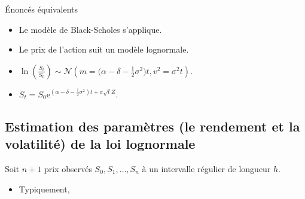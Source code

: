 \documentclass[10pt, french]{article}
\begin{document}
\begin{multicols*}{2}
\begin{conceptgen}{Énoncés équivalents}
\begin{itemize}[leftmargin = *]
	\item	Le modèle de Black-Scholes s'applique.
	\item	Le prix de l'action suit un modèle lognormale.
	\item	$\ln\left(\frac{S_{t}}{S_{0}}\right) \sim \mathcal{N}\left(m = \Big(\alpha - \delta - \frac{1}{2}\sigma^{2}\Big)t, v^{2} = \sigma^{2}t\right)$.
	\item	$S_{t} =	S_{0}\textrm{e}^{(\alpha - \delta - \frac{1}{2}\sigma^{2})t + \sigma\sqrt{t}Z}$.
\end{itemize}
\end{conceptgen}

\columnbreak
\subsection*{Estimation des paramètres (le rendement et la volatilité) de la loi lognormale}
Soit $n + 1$ prix observés $S_{0}, S_{1}, \dots, S_{n}$ à un intervalle régulier de longueur $h$.
\begin{itemize}
	\item	Typiquement, 
\end{itemize}


\end{multicols*}
\end{document}
